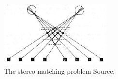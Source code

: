 
\begin{figure}[htbp]
	\centering
	\includegraphics[width=0.5\textwidth]{./figures/stereo.png}
	\caption{The stereo matching problem {\footnotesize Source: \cite{ballard1982}}}
	\label{fig:stereo}
\end{figure}

